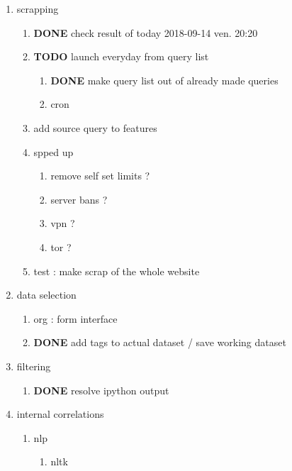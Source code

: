 \documentclass[11pt]{article}
\begin{document}
\begin{enumerate}
\item scrapping
\label{sec:org093fe64}
\begin{enumerate}
\item {\bfseries\sffamily DONE} check result of today 2018-09-14 ven. 20:20
\label{sec:org66f38f2}
\item {\bfseries\sffamily TODO} launch everyday from query list
\label{sec:org6425cf9}
\begin{enumerate}
\item {\bfseries\sffamily DONE} make query list out of already made queries
\label{sec:orgfd468cf}
\item cron
\label{sec:orgf0a24c2}
\end{enumerate}
\item add source query to features
\label{sec:org0e58d35}
\item spped up
\label{sec:orgc434ffe}
\begin{enumerate}
\item remove self set limits ?
\label{sec:org70da6fe}
\item server bans ?
\label{sec:orga694587}
\item vpn ?
\label{sec:org432e219}
\item tor ?
\label{sec:orge312263}
\end{enumerate}
\item test : make scrap of the whole website
\label{sec:org803d69e}
\end{enumerate}
\item data selection
\label{sec:orga6fbe1d}
\begin{enumerate}
\item org : form interface
\label{sec:org9458269}
\item {\bfseries\sffamily DONE} add tags to actual dataset / save working dataset
\label{sec:orgf9727c8}
\end{enumerate}
\item filtering
\label{sec:org81562b5}
\begin{enumerate}
\item {\bfseries\sffamily DONE} resolve ipython output
\label{sec:org09ccf7d}
\end{enumerate}
\item internal correlations
\label{sec:org889d5eb}
\begin{enumerate}
\item nlp
\label{sec:org9a4287b}
\begin{enumerate}
\item nltk

\end{enumerate}
\end{enumerate}
\end{enumerate}
\end{document}
